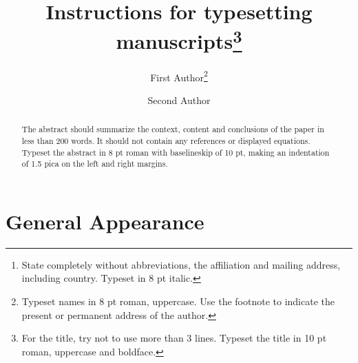 \documentclass{ws-ijmpa}
\begin{document}

%
\catchline{}{}{}{}{}
%

\title{Instructions for typesetting manuscripts\footnote{
For the title, try not to use more than
3 lines. Typeset the title in 10 pt roman, uppercase and
boldface.}
}

\author{First Author\footnote{
Typeset names in 8 pt roman, uppercase. Use the footnote to indicate the
present or permanent address of the author.}
}

\address{University Department, University Name, Address\\
City, State ZIP/Zone, Country\footnote{
State completely without abbreviations, the affiliation and
mailing address, including country. Typeset in 8 pt italic.}\\
first\_author@domain\_name}

\author{Second Author}

\address{Group, Laboratory, Address\\
City, State ZIP/Zone, Country\\
second\_author@domain\_name}

\maketitle

\begin{history}
\end{history}

\begin{abstract}
The abstract should summarize the context, content
and conclusions of the paper in less than 200 words. It should
not contain any references or displayed equations. Typeset the
abstract in 8 pt roman with baselineskip of 10 pt, making
an indentation of 1.5 pica on the left and right margins.

\end{abstract}



\section{General Appearance}	
\end{document}
